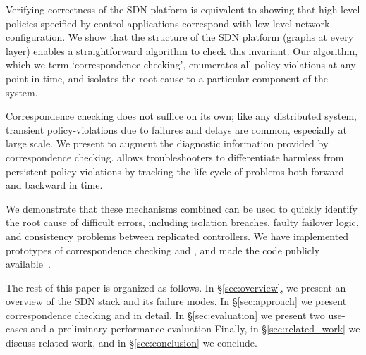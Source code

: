 Verifying correctness of the SDN platform is equivalent to showing that
high-level policies specified by control applications correspond with 
low-level network configuration. We show that the structure of the
SDN platform (graphs at every layer) enables a straightforward
algorithm to check this invariant. Our algorithm, which we term
`correspondence checking',
enumerates all policy-violations at any point in time, and isolates the
root cause to a particular component of the system.

Correspondence checking does not suffice on its own; like any distributed
system, transient policy-violations due to failures and delays are 
common, especially at large scale. We present \simulator{} to
augment the diagnostic information provided by correspondence checking.
\Simulator{} allows troubleshooters 
to differentiate harmless from persistent policy-violations by tracking the life cycle of problems 
both forward and backward in time.

We demonstrate that these mechanisms combined can be used to quickly
identify the root cause of difficult errors, including isolation breaches,
faulty failover logic, and consistency problems between replicated
controllers. We have implemented prototypes
of correspondence checking and \simulator{}, and made the code publicly
available~\cite{github}.

The rest of this paper is organized as follows. In \S\ref{sec:overview},
we present an overview of the SDN stack and its failure modes.
In \S\ref{sec:approach} we present correspondence checking and
\simulator{} in detail. In \S\ref{sec:evaluation} we present
two use-cases and a preliminary performance evaluation
Finally, in \S\ref{sec:related_work} we discuss related work,
and in \S\ref{sec:conclusion} we conclude.
